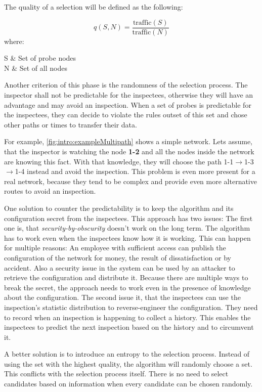 \documentclass[thesis.tex]{subfiles}
\begin{document}
The quality of a selection will be defined as the following:

\begin{equation} \label{equo:qualitySelection}
q(S,N) = \frac{\text{traffic}(S)}{\text{traffic}(N)}
\end{equation}
where:
\begin{conditions}
    S     &  Set of probe nodes \\
    N     &  Set of all nodes
\end{conditions}

Another criterion of this phase is the randomness of the selection process. The inspector shall not be predictable for the inspectees, otherwise they will have an advantage and may avoid an inspection. When a set of probes is predictable for the inspectees, they can decide to violate the rules outset of this set and chose other paths or times to transfer their data. 

For example, \autoref{fig:intro:exampleMultipath} shows a simple network. Lets assume, that the inspector is watching the node \textbf{1-2} and all the nodes inside the network are knowing this fact. With that knowledge, they will choose the path 1-1$\rightarrow$1-3$\rightarrow$1-4 instead and avoid the inspection. This problem is even more present for a real network, because they tend to be complex and provide even more alternative routes to avoid an inspection.

One solution to counter the predictability is to keep the algorithm and its configuration secret from the inspectees. This approach has two issues: The first one is, that \textit{security-by-obscurity} doesn't work on the long term. The algorithm has to work even when the inspectees know how it is working. This can happen for multiple reasons: An employee with sufficient access can publish the configuration of the network for money, the result of dissatisfaction or by accident. Also a security issue in the system can be used by an attacker to retrieve the configuration and distribute it. Because there are multiple ways to break the secret, the approach needs to work even in the presence of knowledge about the configuration.
The second issue it, that the inspectees can use the inspection's statistic distribution to reverse-engineer the configuration. They need to record when an inspection is happening to collect a history. This enables the inspectees to predict the next inspection based on the history and to circumvent it.

A better solution is to introduce an entropy to the selection process. Instead of using the set with the highest quality, the algorithm will randomly choose a set. This conflicts with the selection process itself. There is no need to select candidates based on information when every candidate can be chosen randomly.
\end{document}
